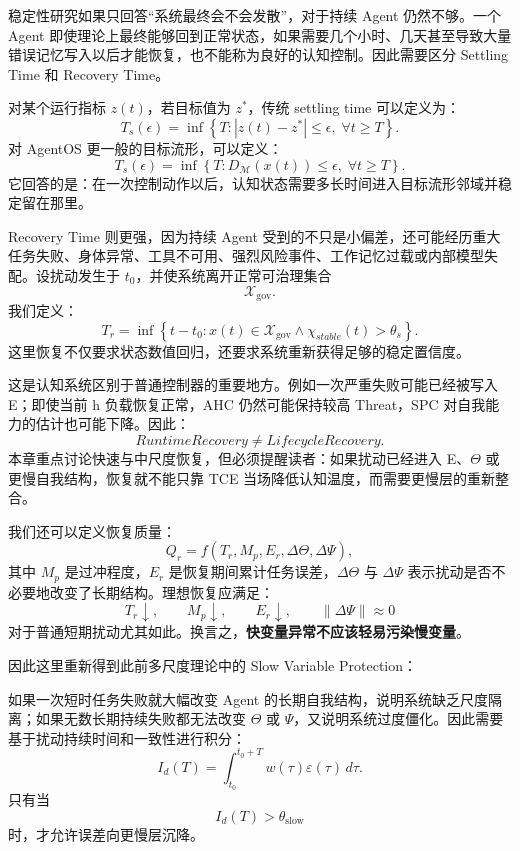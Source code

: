 稳定性研究如果只回答“系统最终会不会发散”，对于持续 Agent 仍然不够。一个 Agent 即使理论上最终能够回到正常状态，如果需要几个小时、几天甚至导致大量错误记忆写入以后才能恢复，也不能称为良好的认知控制。因此需要区分 Settling Time 和 Recovery Time。

对某个运行指标 $z(t)$，若目标值为 $z^{*}$，传统 settling time 可以定义为：
\[
T_s(\epsilon)
=
\inf
\left\{
T:
|z(t)-z^{*}|
\le
\epsilon,
\;\forall t\ge T
\right\}.
\]
对 AgentOS 更一般的目标流形，可以定义：
\[
T_s(\epsilon)
=
\inf
\left\{
T:
D_{\mathcal M}(x(t))
\le
\epsilon,
\;\forall t\ge T
\right\}.
\]
它回答的是：在一次控制动作以后，认知状态需要多长时间进入目标流形邻域并稳定留在那里。

Recovery Time 则更强，因为持续 Agent 受到的不只是小偏差，还可能经历重大任务失败、身体异常、工具不可用、强烈风险事件、工作记忆过载或内部模型失配。设扰动发生于 $t_0$，并使系统离开正常可治理集合
\[
\mathcal X_{\mathrm{gov}}.
\]
我们定义：
\[
T_r
=
\inf
\left\{
t-t_0:
x(t)\in
\mathcal X_{\mathrm{gov}}
\land
\chi_{stable}(t)>\theta_s
\right\}.
\]
这里恢复不仅要求状态数值回归，还要求系统重新获得足够的稳定置信度。

这是认知系统区别于普通控制器的重要地方。例如一次严重失败可能已经被写入 E；即使当前 h 负载恢复正常，AHC 仍然可能保持较高 Threat，SPC 对自我能力的估计也可能下降。因此：
\[
RuntimeRecovery
\neq
LifecycleRecovery.
\]
本章重点讨论快速与中尺度恢复，但必须提醒读者：如果扰动已经进入 E、$\Theta$ 或更慢自我结构，恢复就不能只靠 TCE 当场降低认知温度，而需要更慢层的重新整合。

我们还可以定义恢复质量：
\[
Q_r
=
f
\left(
T_r,
M_p,
E_r,
\Delta\Theta,
\Delta\Psi
\right),
\]
其中 $M_p$ 是过冲程度，$E_r$ 是恢复期间累计任务误差，$\Delta\Theta$ 与 $\Delta\Psi$ 表示扰动是否不必要地改变了长期结构。理想恢复应满足：
\[
T_r\downarrow,
\qquad
M_p\downarrow,
\qquad
E_r\downarrow,
\qquad
\|\Delta\Psi\|\approx0
\]
对于普通短期扰动尤其如此。换言之，\textbf{快变量异常不应该轻易污染慢变量}。

因此这里重新得到此前多尺度理论中的 Slow Variable Protection：
\begin{statementbox}
\centering
{}
\end{statementbox}
如果一次短时任务失败就大幅改变 Agent 的长期自我结构，说明系统缺乏尺度隔离；如果无数长期持续失败都无法改变 $\Theta$ 或 $\Psi$，又说明系统过度僵化。因此需要基于扰动持续时间和一致性进行积分：
\[
I_d(T)
=
\int_{t_0}^{t_0+T}
w(\tau)
\varepsilon(\tau)\,d\tau.
\]
只有当
\[
I_d(T)>\theta_{\mathrm{slow}}
\]
时，才允许误差向更慢层沉降。


